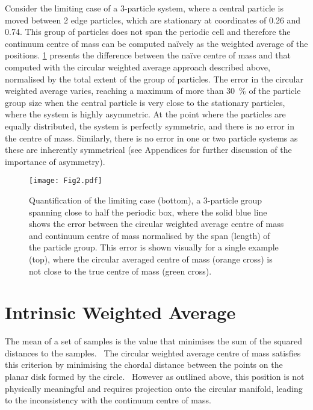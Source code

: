 \documentclass[reprint,superscriptaddress,nobibnotes,amsmath,amssymb,aip]{revtex4-2}
\begin{document}
Consider the limiting case of a 3-particle system, where a central particle is moved between 2 edge particles, which are stationary at coordinates of 0.26 and 0.74. 
This group of particles does not span the periodic cell and therefore the continuum centre of mass can be computed naïvely as the weighted average of the positions. 
\cref{fig:error_quantification} presents the difference between the naïve centre of mass and that computed with the circular weighted average approach described above, normalised by the total extent of the group of particles. 
The error in the circular weighted average varies, reaching a maximum of more than \SI{30}{\percent} of the particle group size when the central particle is very close to the stationary particles, where the system is highly asymmetric. 
At the point where the particles are equally distributed, the system is perfectly symmetric, and there is no error in the centre of mass. 
Similarly, there is no error in one or two particle systems as these are inherently symmetrical (see Appendices for further discussion of the importance of asymmetry). 
%
\begin{figure}
    \centering
    \texttt{[image: Fig2.pdf]}
    \caption{Quantification of the limiting case (bottom), a 3-particle group spanning close to half the periodic box, where the solid blue line shows the error between the circular weighted average centre of mass and continuum centre of mass normalised by the span (length) of the particle group.
    This error is shown visually for a single example (top), where the circular averaged centre of mass (orange cross) is not close to the true centre of mass (green cross).}
    \label{fig:error_quantification}
\end{figure}
%

\section{Intrinsic Weighted Average}

The mean of a set of samples is the value that minimises the sum of the squared distances to the samples.~\cite{neilsen_matrix_2012}
The circular weighted average centre of mass satisfies this criterion by minimising the chordal distance between the points on the planar disk formed by the circle.~\cite{hotz_non-asymptotic_2016}
However as outlined above, this position is not physically meaningful and requires projection onto the circular manifold, leading to the inconsistency with the continuum centre of mass.
\end{document}
